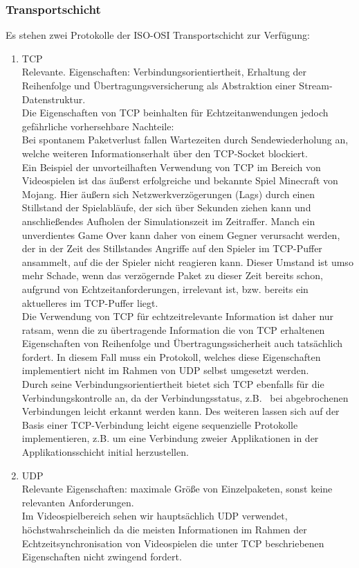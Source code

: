 \documentclass[11pt,twoside,a4paper]{article}
\begin{document}
\subsubsection{Transportschicht}
Es stehen zwei Protokolle der ISO-OSI Transportschicht zur Verfügung:
\begin{enumerate}
\item TCP\\
Relevante. Eigenschaften: Verbindungsorientiertheit, Erhaltung der Reihenfolge und Übertragungsversicherung als Abstraktion einer Stream-Datenstruktur.\\
	Die Eigenschaften von TCP beinhalten für Echtzeitanwendungen jedoch gefährliche vorhersehbare Nachteile:\\
	Bei spontanem Paketverlust fallen Wartezeiten durch Sendewiederholung an, welche weiteren Informationserhalt über den TCP-Socket blockiert.\\
Ein Beispiel der unvorteilhaften Verwendung von TCP im Bereich von Videospielen ist das äußerst erfolgreiche und bekannte Spiel Minecraft von Mojang. Hier äußern sich Netzwerkverzögerungen (Lags) durch einen Stillstand der Spielabläufe, der sich über Sekunden ziehen kann und anschließendes Aufholen der Simulationszeit im Zeitraffer. Manch ein unverdientes Game Over kann daher von einem Gegner verursacht werden, der in der Zeit des Stillstandes Angriffe auf den Spieler im TCP-Puffer ansammelt, auf die der Spieler nicht reagieren kann. Dieser Umstand ist umso mehr Schade, wenn das verzögernde Paket zu dieser Zeit bereits schon, aufgrund von Echtzeitanforderungen, irrelevant ist, bzw. bereits ein aktuelleres im TCP-Puffer liegt.\\
Die Verwendung von TCP für echtzeitrelevante Information ist daher nur ratsam, wenn die zu übertragende Information die von TCP erhaltenen Eigenschaften von Reihenfolge und Übertragungssicherheit auch tatsächlich fordert. In diesem Fall muss ein Protokoll, welches diese Eigenschaften implementiert nicht im Rahmen von UDP selbst umgesetzt werden.\\
Durch seine Verbindungsorientiertheit bietet sich TCP ebenfalls für die Verbindungskontrolle an, da der Verbindungsstatus, z.B.~ bei abgebrochenen Verbindungen leicht erkannt werden kann. Des weiteren lassen sich auf der Basis einer TCP-Verbindung leicht eigene sequenzielle Protokolle implementieren, z.B. um eine Verbindung zweier Applikationen in der Applikationsschicht initial herzustellen.
\item UDP\\
Relevante Eigenschaften: maximale Größe von Einzelpaketen, sonst keine relevanten Anforderungen.\\
	Im Videospielbereich sehen wir hauptsächlich UDP verwendet, höchstwahrscheinlich da die meisten Informationen im Rahmen der Echtzeitsynchronisation von Videospielen die unter TCP beschriebenen Eigenschaften nicht zwingend fordert.
\end{enumerate}
\end{document}
